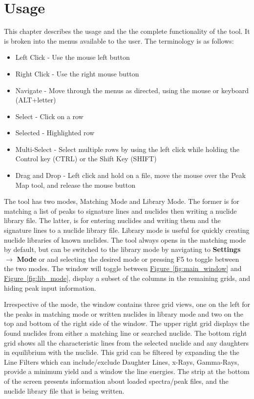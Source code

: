 \documentclass[12pt,report,justified]{SANDreport}
\begin{document}
\chapter{Usage}\label{sec:usage}
This chapter describes the usage and the the complete functionality of the tool. It is broken into
the menus available to the user. The terminology is as follows:
\begin{itemize}
    \item Left Click - Use the mouse left button
    \item Right Click - Use the right mouse button
    \item Navigate - Move through the menus as directed, using the mouse or keyboard (ALT+letter)
    \item Select - Click on a row
    \item Selected - Highlighted row
    \item Multi-Select - Select multiple rows by using the left click while holding the Control key (CTRL) or the Shift Key (SHIFT)\
    \item Drag and Drop - Left click and hold on a file, move the mouse over the Peak Map tool, and release the mouse button
\end{itemize}
The tool has two modes, Matching Mode and Library Mode. The former is for matching a list of
peaks to signature lines and nuclides then writing a nuclide library file. The latter, is for entering
nuclides and writing them and the signature lines to a nuclide library file. Library mode is useful
for quickly creating nuclide libraries of known nuclides. The tool always opens in the matching
mode by default, but can be switched to the library mode by navigating to \textbf{Settings}
\(\rightarrow\) \textbf{Mode} or and selecting the desired mode or pressing F5 to toggle between the
two modes. The window will toggle between \hyperref[fig:main_window]{Figure~\ref{fig:main_window}}
and \hyperref[fig:lib_mode]{Figure~\ref{fig:lib_mode}}, display a subset of the columns in the
remaining grids, and hiding peak input information.

Irrespective of the mode, the window contains three grid views, one on the left for the peaks in
matching mode or written nuclides in library mode and two on the top and bottom of the right side
of the window. The upper right grid displays the found nuclides from either a matching line or searched
nuclide. The bottom right grid shows all the characteristic lines from the selected nuclide and any
daughters in equilibrium with the nuclide. This grid can be filtered by expanding the the Line Filters
which can include/exclude Daughter Lines, x-Rays, Gamma-Rays, provide a minimum yield and a window the
line energies. The strip at the bottom of the screen presents information about loaded spectra/peak
files, and the nuclide library file that is being written.
\end{document}

